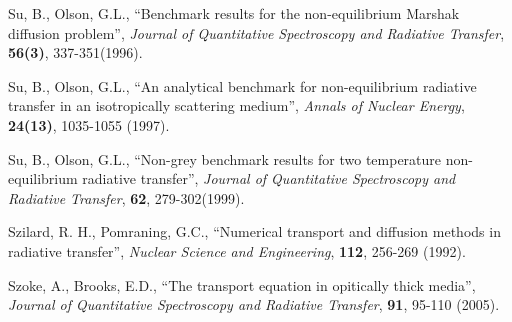 \begin{thebibliography}{Wac 75}
 Su, B., Olson, G.L., ``Benchmark results for the non-equilibrium Marshak diffusion problem'', \emph{Journal of Quantitative Spectroscopy and Radiative Transfer}, \textbf{56(3)}, 337-351(1996).

 Su, B., Olson, G.L., ``An analytical benchmark for non-equilibrium radiative transfer in an isotropically scattering medium'', \emph{Annals of Nuclear Energy}, \textbf{24(13)}, 1035-1055 (1997).

 Su, B., Olson, G.L., ``Non-grey benchmark results for two temperature non-equilibrium radiative transfer'', \emph{Journal of Quantitative Spectroscopy and Radiative Transfer}, \textbf{62}, 279-302(1999).
	
 Szilard, R. H., Pomraning, G.C., ``Numerical transport and diffusion methods in radiative transfer'',
	\emph{Nuclear Science and Engineering}, \textbf{112}, 256-269 (1992).

 Szoke, A., Brooks, E.D., ``The transport equation in opitically thick media'', 
	\emph{Journal of Quantitative Spectroscopy and Radiative Transfer}, \textbf{91}, 95-110 (2005).

\end{thebibliography}

